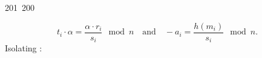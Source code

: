 201~200~\documentclass{article}
\begin{document}
	                                                                        	                                                                    	                                	                    	                    	                        	                        	                    	                                                                	                	                                                                    	                    				\[
	                                                                        	                                                                    	                                	                    	                    	                        	                        	                    	                                                                	                	                                                                    	                    					t_i \cdot \alpha = \frac{\alpha \cdot r_i}{s_i} \mod n \quad \text{and} \quad -a_i = \frac{h(m_i)}{s_i} \mod n.
	                                                                        	                                                                    	                                	                    	                    	                        	                        	                    	                                                                	                	                                                                    	                    					\]
	                                                                        	                                                                    	                                	                    	                    	                        	                        	                    	                                                                	                	                                                                    	                    					Isolating : 
\end{document}
